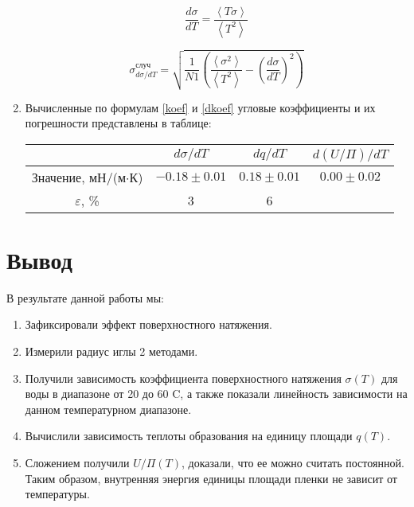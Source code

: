 \documentclass[12pt]{article}
\begin{document}
\begin{enumerate}
        \begin{equation}
            \frac{d\sigma}{dT} = \frac{\left<T\sigma\right>}
            {\left<T^2\right>} \label{koef}
        \end{equation}

        \begin{equation}
            \sigma_{d\sigma/dT}^{\text{случ}} = \sqrt{\frac{1}{N1}\left(\frac{\left<\sigma^2\right>} {\left<T^2\right>} - \left(\frac{d\sigma}{dT}\right)^2\right)}\label{dkoef}
        \end{equation}

        \item Вычисленные по формулам \ref{koef} и \ref{dkoef}
        угловые коэффициенты и их погрешности
        представлены в таблице:
        \begin{table}[H]
            \centering
            \begin{tabular}{|c|c|c|c|}
                \hline
                 & $d\sigma/dT$ & $dq/dT$ & $d(U/\Pi)/dT$ \\ \hline
                Значение, мН/(м$\cdot$К) & $-0.18 \pm 0.01$ & $0.18\pm 0.01 $ & $0.00 \pm 0.02$ \\ \hline
                $\varepsilon$, \% & 3 & 6 & \\ \hline
            \end{tabular}
        \end{table}

    \end{enumerate}

    \section{Вывод}
    В результате данной работы мы:
    \begin{enumerate}
        \item Зафиксировали эффект поверхностного натяжения.
        \item Измерили радиус иглы 2 методами.
        \item Получили зависимость коэффициента поверхностного натяжения
        $\sigma(T)$ для воды в диапазоне от 20 до 60 \textdegree C, а
        также показали линейность зависимости на данном температурном
        диапазоне.
        \item Вычислили зависимость теплоты образования на единицу площади
        $q(T)$.
        \item Сложением получили $U/\Pi(T)$, доказали, что ее можно считать
        постоянной. Таким образом, внутренняя энергия единицы площади
        пленки не зависит от температуры.
    \end{enumerate}
\end{document}
